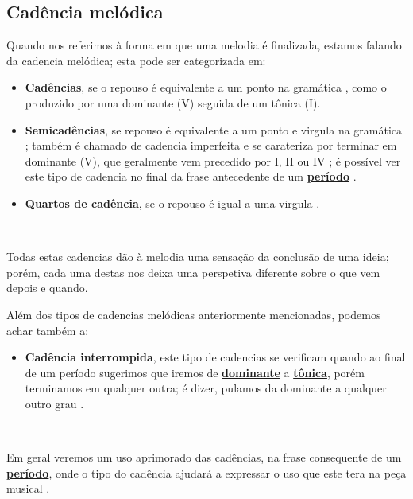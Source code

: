 \subsection{Cadência melódica} 
\label{subsec:cadenciamelodica}
Quando nos referimos à forma em que uma melodia é finalizada,
estamos falando da cadencia melódica; esta pode ser categorizada em: 
\begin{itemize}
\item \textbf{Cadências}, se o repouso é equivalente a um ponto na gramática \cite[pp. 66,67]{melcior1859diccionario},
como o produzido por uma dominante (V) seguida de um tônica (I).
\item \textbf{Semicadências}, se repouso é equivalente a um ponto e virgula na gramática \cite[pp. 66,67]{melcior1859diccionario};
também é chamado de cadencia imperfeita e se carateriza por terminar em dominante (V),
que geralmente vem precedido por  I, II ou IV \cite[pp. 103]{grabner2001teoria}; 
é possível ver este tipo de cadencia no final da frase antecedente de um 
\hyperref[sec:Periodo]{\textbf{período}} \cite[pp. 21]{latham2008diccionario}.
\item \textbf{Quartos de cadência}, se o repouso é igual a uma virgula \cite[pp. 66,67]{melcior1859diccionario}.
\end{itemize}~

Todas estas cadencias dão à melodia uma sensação da conclusão de uma ideia; 
porém, cada uma destas nos deixa uma perspetiva diferente sobre o que vem depois e quando.

Além dos tipos de cadencias melódicas anteriormente mencionadas, podemos achar também a:
\begin{itemize}
\item \textbf{Cadência interrompida}, este tipo de cadencias se verificam 
quando ao final de um período sugerimos que iremos de 
\hyperref[sec:dominante]{\textbf{dominante}} a \hyperref[sec:Tonica]{\textbf{tônica}},
porém terminamos em qualquer outra; é dizer, pulamos da dominante a qualquer outro grau 
\cite[pp. 67]{melcior1859diccionario} \cite[pp. 60]{pedrell2009diccionario}. 
\end{itemize}~

Em geral veremos um uso aprimorado das cadências, na frase consequente de um \hyperref[sec:Periodo]{\textbf{período}},
onde o tipo do cadência ajudará a expressar o uso que este tera na peça musical  \cite[pp. 66,67]{melcior1859diccionario}.

